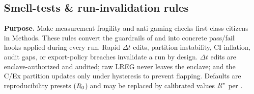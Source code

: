 \documentclass[11pt]{article}
\begin{document}
\subsection{Smell-tests \& run-invalidation rules}
\label{sec:smelltests}

\textbf{Purpose.} Make measurement fragility and anti-gaming checks first-class citizens in Methods. These rules convert the guardrails of  and  into concrete pass/fail hooks applied during every run. Rapid $\Delta t$ edits, partition instability, CI inflation, audit gaps, or export-policy breaches invalidate a run by design. $\Delta t$ edits are enclave-authorized and audited; raw LREG never leaves the enclave; and the C/Ex partition updates only under hysteresis to prevent flapping. Defaults are reproducibility presets ($R_0$) and may be replaced by calibrated values $R^*$ per .
\end{document}
